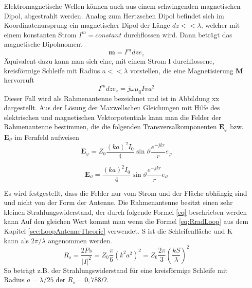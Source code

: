 Elektromagnetische Wellen können auch aus einem schwingenden magnetischen Dipol,
abgestrahlt werden. Analog zum Hertzschen Dipol befindet sich im Koordinatenursprung
ein magnetischer Dipol der Länge $dz<<\lambda$, welcher mit einem konstanten
Strom $I^{m}=constant$ durchflossen wird. Dann beträgt das magnetische Dipolmoment
\begin{equation}
\textbf{m}=I^{m}dze_z
\end{equation}
Äquivalent dazu kann man sich eine, mit einem Strom I durchflossene, kreisförmige
Schleife mit Radius $a<<\lambda$ vorstellen, die eine Magnetisierung $\textbf{M}$ hervorruft
\begin{equation}
I^{m}dze_{z}=j\omega\mu_{0}I\pi a^{2}
\end{equation}
Dieser Fall wird als Rahmenantenne bezeichnet und ist in Abbildung xx dargestellt. Aus der Lösung der Maxwellschen Gleichungen mit Hilfe des elektrischen und
magnetischen Vektorpotentials kann man die Felder der Rahmenantenne bestimmen,
die die folgenden Transversalkomponenten $\textbf{E}_{\varphi}$ bzw.$\textbf{E}_{\vartheta}$ im Fernfeld aufweisen
\begin{equation}
\textbf{E}_{\varphi}=Z_{0}\dfrac{(ka)^2I_{0}}{4}\sin \vartheta \dfrac{e^{-jkr}}{r} e_{\varphi}
\end{equation}

\begin{equation}
\textbf{E}_{\vartheta}=\dfrac{(ka)^2I_{0}}{4}\sin \vartheta \dfrac{e^{-jkr}}{r} e_{\vartheta}
\end{equation}

Es wird festgestellt, dass die Felder nur vom Strom und der Fläche abhängig sind
und nicht von der Form der Antenne. 
Die Rahmenantenne besitzt einen sehr kleinen Strahlungswiderstand, der durch folgende
Formel \ref{eq} beschrieben werden kann Auf den gleichen Wert kommt man wenn die Formel \ref{eq:RradLoop} aus dem Kapitel \ref{sec:LoopAntenneTheorie} verwendet. S ist die Schleifenfläche und K kann als $2\pi/\lambda$ angenommen werden.
\begin{equation}\label{eq:RS_LOOP}
R_{s}=\dfrac{2Ps}{|I|^{2}}=Z_{0}\dfrac{\pi}{6}(k^{2}a^{2})^{2}=Z_{0}\dfrac{2\pi}{3}\left(\dfrac{kS}{\lambda}\right)^{2} 
\end{equation}
So beträgt z.B. der Strahlungswiderstand für eine kreisförmige Schleife mit Radius $a = \lambda/25$ der  $R_{s} = 0,788\Omega$.



